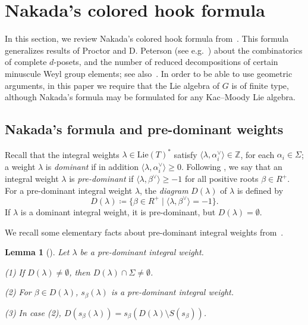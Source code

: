 \documentclass[11pt]{article}
\newtheorem{lemma}[theo]{Lemma}
\theoremstyle{definition}
\numberwithin{equation}{section}
\newcommand{\bZ}{{\mathbb Z}}
\begin{document}
\section{Nakada's colored hook formula}\label{sec:hook}
In this section, we review Nakada's colored hook formula from~\cite{nakada:colored,nakada:proc}. This formula generalizes results of Proctor 
\cite{proctor:minuscule,proctor:dynkin}
and D. Peterson (see e.g.~\cite{carrell:vector})
about the combinatorics of complete $d$-posets, and the number of reduced 
decompositions of certain minuscule Weyl group elements; see also~\cite{stanley:reduced}. 
In order to be able to use geometric arguments, in this paper we require that the Lie algebra of $G$
is of finite 
type, although Nakada's formula may be formulated for any Kac--Moody Lie algebra.


\subsection{Nakada's formula and pre-dominant weights}\label{sec:predominant} Recall that the integral weights
$\lambda \in \mathrm{Lie}(T)^*$
satisfy 
$\langle\lambda,\alpha_i^\vee\rangle\in \bZ$, for each $\alpha_i \in \Sigma$; a weight $\lambda$ is {\em dominant} if in addition $\langle\lambda,\alpha_i^\vee\rangle\geq 0$. Following 
\cite{nakada:colored}, we say that an integral weight $\lambda$ is {\em pre-dominant} if
$\langle \lambda, \beta^\vee\rangle \geq -1$ for all positive roots $\beta \in R^{+}$. For a pre-dominant integral weight $\lambda$, the {\em diagram} $D(\lambda)$ of $\lambda$ is defined by
\begin{equation}\label{diagram}
	D(\lambda)\coloneqq \{\beta\in R^{+} \mid \langle\lambda, \beta^\vee\rangle =-1\}.
\end{equation}
\noindent
If $\lambda$ is a dominant integral weight, it is pre-dominant, but $D(\lambda)=\emptyset$. 

We recall some elementary facts about pre-dominant integral weights from~\cite{nakada:colored}. 
\begin{lemma}[{\cite[Lemma 4.1]{nakada:colored}}]\label{lem:pre-dom}
	Let $\lambda$ be a pre-dominant integral weight. 
	
	
	(1) If $D(\lambda)\neq\emptyset$, then $D(\lambda) \cap \Sigma\neq \emptyset$.
	
	(2) For $\beta\in D(\lambda)$, $s_\beta(\lambda)$ is a pre-dominant integral weight.
	
	(3) In case (2), $D(s_\beta(\lambda))=s_\beta(D(\lambda)\setminus S(s_\beta))$.
\end{lemma}
\end{document}
